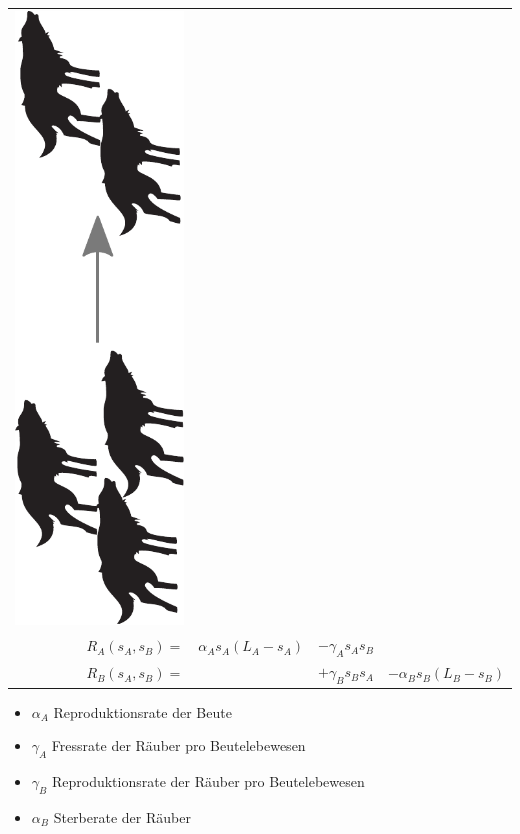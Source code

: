 \documentclass[12pt]{beamer}
\begin{document}
\begin{frame}
\begin{tabular}{ r c c c }
      \includegraphics[scale=0.12,angle=-90]{Bilder/lv_kill.pdf}
	  \\
	  \(
		R_A(s_A,s_B)=
	  \)
	  &
	  \(
		\alpha_A s_A (L_A-s_A)
	  \)
	  &
	  \(
		- \gamma_A s_A s_B
	  \)
	  &
	  \\
	  \(
		R_B(s_A,s_B)=
	  \)
	  &
	  &
	  \(
		+ \gamma_B s_B s_A
	  \)
	  &
	  \(
		- \alpha_B s_B (L_B-s_B)
	  \)
	  \\
      \end{tabular}
      \renewcommand{\arraystretch}{1.0}
      \begin{itemize}
	  \item $\alpha_A$ Reproduktionsrate der Beute
	  \item $\gamma_A$ Fressrate der Räuber pro Beutelebewesen
	  \item $\gamma_B$ Reproduktionsrate der Räuber pro Beutelebewesen
	  \item $\alpha_B$ Sterberate der Räuber
      \end{itemize}
    \end{frame}
    
\end{document}
